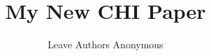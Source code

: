 \documentclass[manuscript,review,anonymous]{acmart}
\begin{document}
\title[My New CHI Paper]{My New CHI Paper}

\author{Leave Authors Anonymous}










\maketitle
\end{document}
